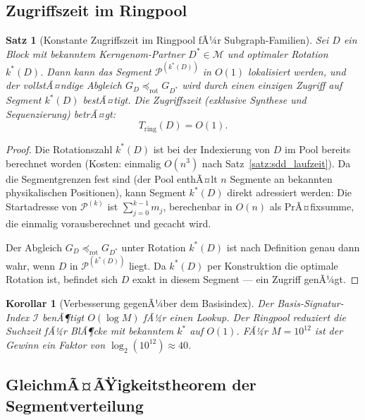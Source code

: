 ﻿\documentclass[a4paper,12pt]{article}
\theoremstyle{definition}
\theoremstyle{plain}
\newtheorem{satz}{Satz}[section]
\newtheorem{korollar}{Korollar}[section]
\begin{document}
\subsection{Zugriffszeit im Ringpool}
\label{ssec:ringpool_zugriff}

\begin{satz}[Konstante Zugriffszeit im Ringpool fÃ¼r Subgraph-Familien]
\label{satz:ringpool_zugriff}
  Sei $D$ ein Block mit bekanntem Kerngenom-Partner $D^* \in \mathcal{M}$
  und optimaler Rotation $k^*(D)$.  Dann kann das Segment
  $\mathcal{P}^{(k^*(D))}$ in $O(1)$ lokalisiert werden, und der
  vollstÃ¤ndige Abgleich $G_D \preceq_{\mathrm{rot}} G_{D^*}$ wird durch
  einen einzigen Zugriff auf Segment $k^*(D)$ bestÃ¤tigt.
  Die Zugriffszeit (exklusive Synthese und Sequenzierung) betrÃ¤gt:
  \[
    T_{\mathrm{ring}}(D) = O(1).
  \]
\end{satz}

\begin{proof}
  Die Rotationszahl $k^*(D)$ ist bei der Indexierung von $D$ im Pool
  bereits berechnet worden (Kosten: einmalig $O(n^3)$ nach
  Satz~\ref{satz:sdd_laufzeit}).  Da die Segmentgrenzen fest sind
  (der Pool enthÃ¤lt $n$ Segmente an bekannten physikalischen Positionen),
  kann Segment $k^*(D)$ direkt adressiert werden: Die Startadresse von
  $\mathcal{P}^{(k)}$ ist $\sum_{j=0}^{k-1} m_j$, berechenbar in $O(n)$
  als PrÃ¤fixsumme, die einmalig vorausberechnet und gecacht wird.

  Der Abgleich $G_D \preceq_{\mathrm{rot}} G_{D^*}$ unter Rotation $k^*(D)$
  ist nach Definition genau dann wahr, wenn $D$ in $\mathcal{P}^{(k^*(D))}$
  liegt.  Da $k^*(D)$ per Konstruktion die optimale Rotation ist,
  befindet sich $D$ exakt in diesem Segment --- ein Zugriff genÃ¼gt. 
\end{proof}

\begin{korollar}[Verbesserung gegenÃ¼ber dem Basisindex]
\label{kor:ringpool_verbesserung}
  Der Basis-Signatur-Index $\mathcal{I}$ benÃ¶tigt $O(\log M)$ fÃ¼r einen
  Lookup.  Der Ringpool reduziert die Suchzeit fÃ¼r BlÃ¶cke mit bekanntem
  $k^*$ auf $O(1)$.  FÃ¼r $M = 10^{12}$ ist der Gewinn ein Faktor von
  $\log_2(10^{12}) \approx 40$.
\end{korollar}

\subsection{GleichmÃ¤ÃŸigkeitstheorem der Segmentverteilung}
\label{ssec:ringpool_gleichmaessigkeit}
\end{document}

